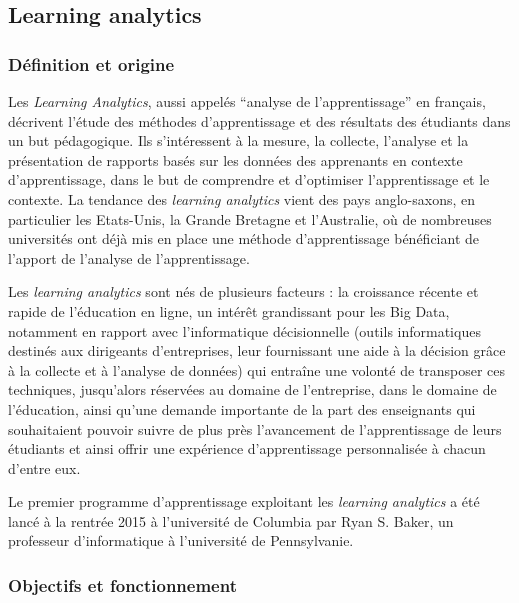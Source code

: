         \subsection{Learning analytics}
   
        \subsubsection{Définition et origine}
            
            Les \emph{Learning Analytics}, aussi appelés \enquote{analyse de l’apprentissage} en français, décrivent l’étude des méthodes d’apprentissage et des résultats des étudiants dans un but pédagogique. Ils s’intéressent à  la mesure, la collecte, l’analyse et la présentation de rapports basés sur les données des apprenants en contexte d’apprentissage, dans le but de comprendre et d’optimiser l’apprentissage et le contexte. La tendance des \emph{learning analytics} vient des pays anglo-saxons, en particulier les Etats-Unis, la Grande Bretagne et l’Australie, où de nombreuses universités ont déjà mis en place une méthode d’apprentissage bénéficiant de l’apport de l’analyse de l’apprentissage.

             Les \emph{learning analytics} sont nés de plusieurs facteurs : la croissance récente et rapide de l’éducation en ligne, un intérêt grandissant pour les Big Data, notamment en rapport avec l’informatique décisionnelle (outils informatiques destinés aux dirigeants d’entreprises, leur fournissant une aide à la décision grâce à la collecte et à l’analyse de données) qui entraîne une volonté de transposer ces techniques, jusqu’alors réservées au domaine de l’entreprise, dans le domaine de l’éducation, ainsi qu’une demande importante de la part des enseignants qui souhaitaient pouvoir suivre de plus près l’avancement de l’apprentissage de leurs étudiants et ainsi offrir une expérience d’apprentissage personnalisée à chacun d’entre eux. 
       
            Le premier programme d’apprentissage exploitant les \emph{learning analytics} a été lancé à la rentrée 2015 à l’université de Columbia par Ryan S. Baker, un professeur d’informatique à l’université de Pennsylvanie.
       
       \subsubsection{Objectifs et fonctionnement}
    
